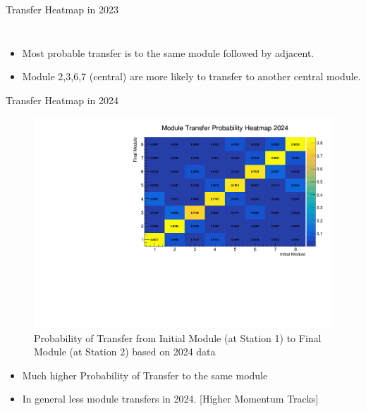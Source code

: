 \begin{frame}{Transfer Heatmap in 2023}
\begin{columns}
\begin{column}{0.2\linewidth}
\begin{figure}
            \end{figure}
        \end{column}
    \end{columns}
    \begin{itemize}
        \small
        \item Most probable transfer is to the same module followed by adjacent.
        \item Module 2,3,6,7 (central) are more likely to transfer to another central module. 
    \end{itemize}
\end{frame}

\begin{frame}{Transfer Heatmap in 2024}
    \begin{figure}
        \includegraphics[width=0.8\linewidth]{./ModuleLevelPlots/st0_module_number vs st1_module_number_prob_2024.pdf}
        \caption{Probability of Transfer from Initial Module (at Station 1) to Final Module (at Station 2) based on 2024 data}
    \end{figure}
    \begin{itemize}
        \small
        \item Much higher Probability of Transfer to the same module
        \item In general less module transfers in 2024. [Higher Momentum Tracks]
    \end{itemize}
\end{frame}

